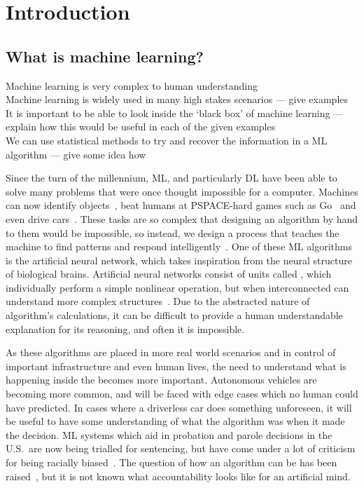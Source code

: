 
\chapter{Introduction}

\section{What is machine learning?}
\begin{todo}
	Machine learning is very complex to human understanding \\
	Machine learning is widely used in many high stakes scenarios --- give examples \\
	It is important to be able to look inside the `black box' of machine learning --- explain how this would be useful in each of the given examples \\
	We can use statistical methods to try and recover the information in a ML algorithm --- give some idea how
\end{todo}

Since the turn of the millennium, \ac{ML}, and particularly \ac{DL} have been able to solve many problems that were once thought impossible for a computer.
Machines can now identify objects~\autocite{li2018}, beat humans at PSPACE-hard games such as Go~\autocite{chao2018} and even drive cars~\autocite{gerla2014}.
These tasks are so complex that designing an algorithm by hand to  them would be impossible, so instead, we design a process that teaches the machine to find patterns and respond intelligently~\autocite[1]{murphy2012}.
One of these \ac{ML} algorithms is the artificial neural network, which takes inspiration from the neural structure of biological brains.
Artificial neural networks consist of units called , which individually perform a simple nonlinear operation, but when interconnected can understand more complex structures~\autocite[436]{lecun2015}.
Due to the abstracted nature of  algorithm's calculations, it can be difficult to provide a human understandable explanation for its reasoning, and often it is impossible.

As these algorithms are placed in more real world scenarios and in control of important infrastructure and even human lives, the need to understand what is happening inside the  becomes more important.
Autonomous vehicles are becoming more common, and will be faced with edge cases which no human could have predicted.
In cases where a driverless car does something unforeseen, it will be useful to have some understanding of what the algorithm was  when it made the decision.
\ac{ML} systems which aid in probation and parole decisions in the U.S.\ are now being trialled for sentencing, but have come under a lot of criticism for being racially biased~\autocite{christin2015}.
The question of how an algorithm can be  has been raised~\autocite[9]{christin2015}, but it is not known what accountability looks like for an artificial mind.
